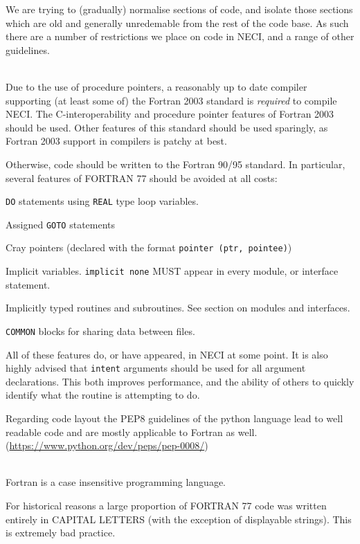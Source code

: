 \documentclass[a4paper,notitlepage,dvipsnames]{scrreprt}
\newenvironment{packed_itemize}{
	\begin{itemize}
		\setlength{\itemsep}{1pt}
		\setlength{\parskip}{0pt}
		\setlength{\parsep}{0pt}
	}{\end{itemize}}
\newcommand\headitem[1]{\needspace{1.5\baselineskip}\item[{\boldmath #1 \nopagebreak}] \hfill \\ \nopagebreak}
\let\code\lstinline
\begin{document}
We are trying to (gradually) normalise sections of code, and isolate those
sections which are old and generally unredemable from the rest of the code
base. As such there are a number of restrictions we place on code in NECI,
and a range of other guidelines.

\begin{description}

	\headitem{Fortran standard}
		Due to the use of procedure pointers, a reasonably up to date compiler
		supporting (at least some of) the Fortran 2003 standard is
		\emph{required} to compile NECI. The C-interoperability and procedure
		pointer features of Fortran 2003 should be used. Other features of this
		standard should be used sparingly, as Fortran 2003 support in compilers
		is patchy at best.

		Otherwise, code should be written to the Fortran 90/95 standard. In
		particular, several features of FORTRAN 77 should be avoided at all
		costs:
		\begin{packed_itemize}
			\item
				\code{DO} statements using \code{REAL} type loop
				variables.
			\item Assigned \code{GOTO} statements
			\item
				Cray pointers (declared with the format
				\code{pointer (ptr, pointee)})
			\item
				Implicit variables. \code{implicit none} MUST appear in
				every module, or interface statement.
			\item
				Implicitly typed routines and subroutines. See section on
				modules and interfaces.
			\item
				\code{COMMON} blocks for sharing data between files.
		\end{packed_itemize}
		All of these features do, or have appeared, in NECI at some point.
        It is also highly advised that \code{intent} arguments
        should be used for all argument declarations.
        This both improves performance, and the ability of
        others to quickly identify what the routine is attempting to do.

        Regarding code layout the PEP8 guidelines of the python language
        lead to well readable code and are mostly applicable to Fortran
        as well. (\url{https://www.python.org/dev/peps/pep-0008/})

	\headitem{CAPITAL letters}
		Fortran is a case insensitive programming language.

		For historical reasons a large proportion of FORTRAN 77 code was
		written entirely in CAPITAL LETTERS (with the exception of displayable
		strings). This is extremely bad practice.


\end{description}
\end{document}

